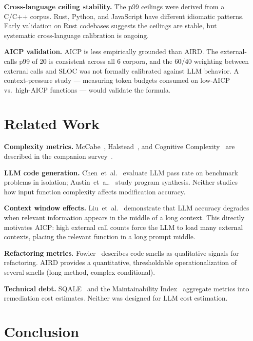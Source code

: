 \documentclass[10pt,twocolumn,letterpaper]{article}
\begin{document}
\textbf{Cross-language ceiling stability.}  The p99 ceilings were derived
from a C/C++ corpus.  Rust, Python, and JavaScript have different idiomatic
patterns.  Early validation on Rust codebases suggests the ceilings are
stable, but systematic cross-language calibration is ongoing.

\textbf{AICP validation.}  AICP is less empirically grounded than AIRD.
The external-calls p99 of 20 is consistent across all 6 corpora, and the
60/40 weighting between external calls and SLOC was not formally
calibrated against LLM behavior.  A context-pressure study --- measuring
token budgets consumed on low-AICP vs.\ high-AICP functions --- would
validate the formula.

\section{Related Work}
\label{sec:related}

\textbf{Complexity metrics.}
McCabe~\cite{mccabe}, Halstead~\cite{halstead}, and Cognitive
Complexity~\cite{cognitive-complexity} are described in the companion
survey~\cite{knots-survey}.

\textbf{LLM code generation.}
Chen~et~al.~\cite{chen-codex} evaluate LLM pass rate on benchmark problems
in isolation; Austin~et~al.~\cite{austin-mbpp} study program synthesis.
Neither studies how input function complexity affects modification accuracy.

\textbf{Context window effects.}
Liu~et~al.~\cite{liu-lost} demonstrate that LLM accuracy degrades when
relevant information appears in the middle of a long context.  This
directly motivates AICP: high external call counts force the LLM to load
many external contexts, placing the relevant function in a long prompt
middle.

\textbf{Refactoring metrics.}
Fowler~\cite{fowler} describes code smells as qualitative signals for
refactoring.  AIRD provides a quantitative, thresholdable operationalization
of several smells (long method, complex conditional).

\textbf{Technical debt.}
SQALE~\cite{sqale} and the Maintainability Index~\cite{mi} aggregate
metrics into remediation cost estimates.  Neither was designed for
LLM cost estimation.

\section{Conclusion}
\label{sec:conclusion}
\end{document}
